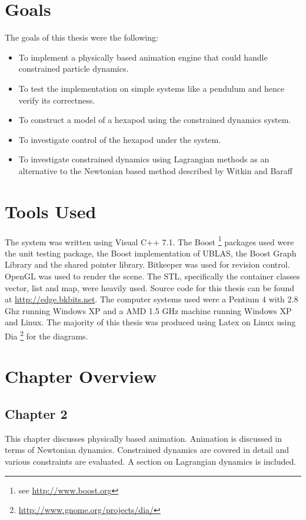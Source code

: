 \section{Goals}
\label{Sec:Goals}
The goals of this thesis were the following:
\begin{itemize}
\item To implement a physically based animation engine that could handle
constrained particle dynamics.
\item To test the implementation on simple systems like a pendulum and hence
verify its correctness.
\item To construct a model of a hexapod using the constrained dynamics system.
\item To investigate control of the hexapod under the system.
\item To investigate constrained dynamics using Lagrangian methods as an
alternative to the Newtonian based method described by Witkin and Baraff
\cite{PBMNotes}  
\end{itemize}

\section{Tools Used}
\label{Sec:Tools}
The system was written using Visual C++ 7.1. The Boost \footnote{see \url{http://www.boost.org}} packages
used were the unit testing package, the Boost implementation of UBLAS, the
Boost Graph Library and the shared pointer library. Bitkeeper was used for
revision control. OpenGL was used to render the scene. The STL, specifically
the container classes vector, list and map, were heavily used. Source code for
this thesis can be found at \url{http://edge.bkbits.net}. 
The computer systems used were a Pentium 4 with 2.8
Ghz running Windows XP and a AMD 1.5 GHz machine running Windows XP and Linux.
The majority of this thesis was produced using Latex on Linux using Dia \footnote{\url{http://www.gnome.org/projects/dia/}}
for the diagrams.

\section{Chapter Overview}
\label{Sec:ChapterOverview}
\subsection{Chapter 2}
This chapter discusses physically based animation. Animation is discussed in
terms of Newtonian dynamics. Constrained dynamics are covered in detail and
various constraints are evaluated. A section on Lagrangian dynamics is included.


